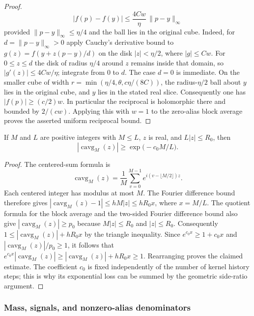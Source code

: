 \begin{proof}
\[
  |f(p)-f(y)|\leq \frac{4Cw}{\eta}\,\|p-y\|_\infty
\]
provided $\|p-y\|_\infty\leq\eta/4$ and the ball lies in the original cube.
Indeed, for $d=\|p-y\|_\infty>0$ apply Cauchy's derivative bound to
$g(z)=f(y+z(p-y)/d)$ on the disk $|z|<\eta/2$, where $|g|\leq Cw$.
For $0\leq z\leq d$ the disk of radius $\eta/4$ around $z$ remains
inside that domain, so $|g'(z)|\leq4Cw/\eta$; integrate from $0$ to $d$.
The case $d=0$ is immediate. On the smaller cube of width
$r=\min(\eta/4,\theta,c\eta/(8C))$, the radius-$\eta/2$ ball about
$y$ lies in the original cube, and $y$ lies in the stated real slice.
Consequently one has
$|f(p)|\geq(c/2)w$. In particular the reciprocal is holomorphic there and
bounded by $2/(cw)$. Applying this with $w=1$ to the zero-alias block average proves
the asserted uniform reciprocal bound.
\end{proof}

\begin{lemma}
\label{lem:ex-lattice-principal-plank}
If $M$ and $L$ are positive integers with $M\leq L$, $z$ is real, and
$L|z|\leq R_0$, then
\[
 |\operatorname{cavg}_M(z)|\geq
 \exp\bigl(-c_0 M/L\bigr).
\]
\end{lemma}

\begin{proof}
The centered-sum formula is
\[
 \operatorname{cavg}_M(z)=\frac1M\sum_{v=0}^{M-1}
   e^{i(v-\lfloor M/2\rfloor)z}.
\]
Each centered integer has modulus at most $M$. The Fourier difference bound
therefore gives
$|\operatorname{cavg}_M(z)-1|\leq hM|z|\leq hR_0x$, where $x=M/L$.
The quotient formula for the block average and the two-sided Fourier difference bound also give
$|\operatorname{cavg}_M(z)|\geq p_0$ because $M|z|\leq R_0$ and
$|z|\leq R_0$. Consequently
$1\leq|\operatorname{cavg}_M(z)|+hR_0x$ by the triangle
inequality. Since $e^{c_0x}\geq1+c_0x$ and
$|\operatorname{cavg}_M(z)|/p_0\geq1$, it follows that
$e^{c_0x}|\operatorname{cavg}_M(z)|\geq
|\operatorname{cavg}_M(z)|+hR_0x\geq1$.
Rearranging proves the claimed estimate. The coefficient $c_0$ is fixed
independently of the number of kernel history steps; this is why its exponential
loss can be summed by the geometric side-ratio argument.
\end{proof}

\subsubsection{Mass, signals, and nonzero-alias denominators}

